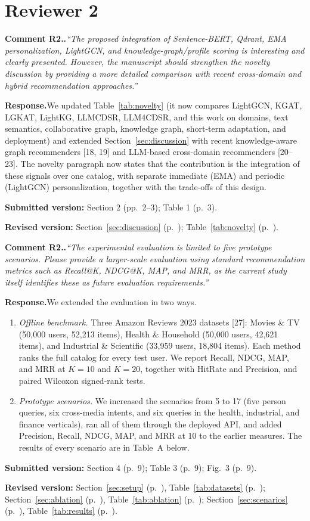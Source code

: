 \documentclass[10pt]{article}
\newcounter{rc}
\newcommand{\reviewer}[1]{\setcounter{rc}{0}\section*{Reviewer #1}}
\newcommand{\point}[2]{\stepcounter{rc}%
  \par\medskip\noindent\textbf{Comment #1.\arabic{rc}.}\enspace\textit{``#2''}\par}
\newcommand{\response}{\noindent\textbf{Response.}\enspace}
\newcommand{\where}[2]{\par\noindent\textbf{Submitted version:} #1\par\noindent\textbf{Revised version:} #2\par}
\newcommand{\sect}[1]{Section~\ref{#1} (p.~\pageref{#1})}
\newcommand{\tabl}[1]{Table~\ref{#1} (p.~\pageref{#1})}
\begin{document}
\reviewer{2}

\point{R2}{The proposed integration of Sentence-BERT, Qdrant, EMA personalization, LightGCN, and knowledge-graph/profile scoring is interesting and clearly presented. However, the manuscript should strengthen the novelty discussion by providing a more detailed comparison with recent cross-domain and hybrid recommendation approaches.}
\response We updated Table~\ref{tab:novelty} (it now compares LightGCN, KGAT, LGKAT, LightKG, LLMCDSR, LLM4CDSR, and this work on domains, text semantics, collaborative graph, knowledge graph, short-term adaptation, and deployment) and extended Section~\ref{sec:discussion} with recent knowledge-aware graph recommenders [18, 19] and LLM-based cross-domain recommenders [20--23]. The novelty paragraph now states that the contribution is the integration of these signals over one catalog, with separate immediate (EMA) and periodic (LightGCN) personalization, together with the trade-offs of this design.
\where{Section 2 (pp.~2--3); Table 1 (p.~3).}{\sect{sec:discussion}; \tabl{tab:novelty}.}

\point{R2}{The experimental evaluation is limited to five prototype scenarios. Please provide a larger-scale evaluation using standard recommendation metrics such as Recall@K, NDCG@K, MAP, and MRR, as the current study itself identifies these as future evaluation requirements.}
\response We extended the evaluation in two ways.
\begin{enumerate}[label=(\arabic*),itemsep=0pt]
  \item \emph{Offline benchmark.} Three Amazon Reviews 2023 datasets [27]: Movies \& TV (50,000 users, 52,213 items), Health \& Household (50,000 users, 42,621 items), and Industrial \& Scientific (33,959 users, 18,804 items). Each method ranks the full catalog for every test user. We report Recall, NDCG, MAP, and MRR at $K=10$ and $K=20$, together with HitRate and Precision, and paired Wilcoxon signed-rank tests.
  \item \emph{Prototype scenarios.} We increased the scenarios from 5 to 17 (five person queries, six cross-media intents, and six queries in the health, industrial, and finance verticals), ran all of them through the deployed API, and added Precision, Recall, NDCG, MAP, and MRR at 10 to the earlier measures. The results of every scenario are in Table~A below.
\end{enumerate}
\where{Section 4 (p.~9); Table 3 (p.~9); Fig.~3 (p.~9).}{\sect{sec:setup}, \tabl{tab:datasets}; \sect{sec:ablation}, \tabl{tab:ablation}; \sect{sec:scenarios}, \tabl{tab:results}.}
\end{document}

